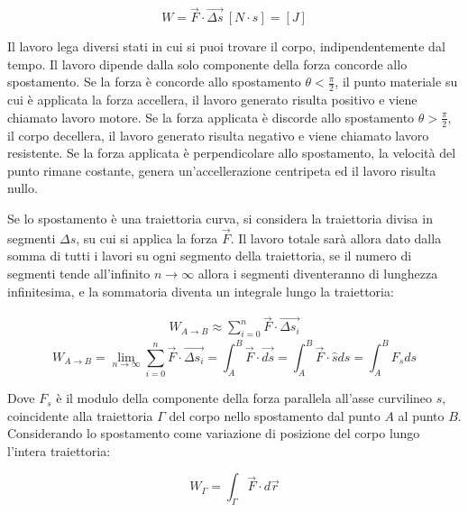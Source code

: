 \documentclass{article}
\numberwithin{equation}{subsection}
\begin{document}
\begin{equation}
    W=\vec{F}\cdot\vec{\Delta s}\:\left[N\cdot s\right]=\left[J\right]
\end{equation}

Il lavoro lega diversi stati in cui si puoi trovare il corpo, 
indipendentemente dal tempo. Il lavoro dipende 
dalla solo componente della forza concorde allo spostamento. 
Se la forza è concorde allo spostamento $\theta<\displaystyle\frac{\pi}{2}$, il punto materiale su cui è applicata la forza accellera, il lavoro generato risulta positivo e viene chiamato lavoro motore. Se la 
forza applicata è discorde allo spostamento $\theta>\displaystyle\frac{\pi}{2}$, il corpo decellera, il lavoro generato risulta negativo e viene chiamato lavoro resistente. 
Se la forza applicata è perpendicolare allo spostamento, la velocità del punto rimane costante, genera un'accellerazione centripeta ed il lavoro risulta nullo. 



Se lo spostamento è una traiettoria curva, si considera la 
traiettoria divisa in segmenti $\Delta s$, su cui si 
applica la forza $\vec{F}$. Il lavoro totale sarà allora dato 
dalla somma di tutti i lavori su ogni segmento della 
traiettoria, se il numero di segmenti tende all'infinito $n\to\infty$ 
allora i segmenti diventeranno di lunghezza infinitesima, e la 
sommatoria diventa un integrale lungo la traiettoria:

\begin{gather*}
    \displaystyle W_{A\to B}\approx\sum_{i=0}^{n}\vec{F}\cdot\vec{\Delta s_i}
\end{gather*}   
\begin{equation}
    W_{A\to B}=\lim_{n\to\infty}\sum_{i=0}^{n}\vec{F}\cdot\vec{\Delta s_i}=\int_{A}^{B}\vec{F}\cdot\vec{ds}=\int_{A}^{B}\vec{F}\cdot\hat{s}ds=\int_{A}^{B}F_sds
\end{equation}

Dove $F_s$ è il modulo della componente della forza parallela 
all'asse curvilineo $s$, coincidente alla traiettoria $\Gamma$ 
del corpo nello spostamento dal punto $A$ al punto $B$.
Considerando lo spostamento come variazione di posizione 
del corpo lungo l'intera traiettoria:

\begin{equation}
    \displaystyle W_{\Gamma}=\int_{\Gamma}\vec{F}\cdot d\vec{r}
\end{equation}

\begin{center}\end{center}
\end{document}
